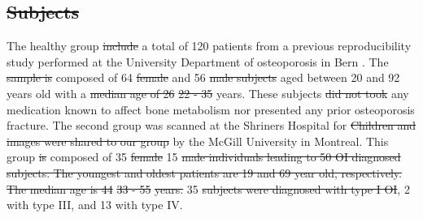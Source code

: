 \documentclass[a4paper,fleqn]{DC_ArtStyle}
\providecommand{\DIFadd}[1]{{\protect\color{blue}{#1}}} %
\providecommand{\DIFdel}[1]{{\protect\color{red}\sout{#1}}}                      %
\providecommand{\DIFaddbegin}{} %
\providecommand{\DIFaddend}{} %
\providecommand{\DIFdelbegin}{} %
\providecommand{\DIFdelend}{} %
\begin{document}
\subsection{\DIFdelbegin \DIFdel{Subjects}\DIFdelend \DIFaddbegin \DIFadd{Participants}\DIFaddend }
The healthy group \DIFdelbegin \DIFdel{include }\DIFdelend \DIFaddbegin \DIFadd{included }\DIFaddend a total of 120 patients from a previous reproducibility study performed at the University Department of osteoporosis in Bern \cite{Schenk2020}. The \DIFdelbegin \DIFdel{sample is }\DIFdelend \DIFaddbegin \DIFadd{group was }\DIFaddend composed of 64 \DIFdelbegin \DIFdel{female }\DIFdelend \DIFaddbegin \DIFadd{females }\DIFaddend and 56 \DIFdelbegin \DIFdel{male subjects }\DIFdelend \DIFaddbegin \DIFadd{males }\DIFaddend aged between 20 and 92 years old with a \DIFdelbegin \DIFdel{median age of 26 }%
\DIFdel{22 - 35}%
\DIFdelend \DIFaddbegin \DIFadd{mean age of 32 $\pm$ 15 }\DIFaddend years. These subjects \DIFdelbegin \DIFdel{did not took }\DIFdelend \DIFaddbegin \DIFadd{had not taken }\DIFaddend any medication known to affect bone metabolism nor presented \DIFaddbegin \DIFadd{with }\DIFaddend any prior osteoporosis fracture. The second group was scanned \DIFaddbegin \DIFadd{as part of the ASTEROID study at different locations in Canada, namely }\DIFaddend at the Shriners Hospital for \DIFdelbegin \DIFdel{Children and images were shared to our group }\DIFdelend \DIFaddbegin \DIFadd{Children-Canada. The study coordination was done }\DIFaddend by the McGill University in Montreal. This group \DIFdelbegin \DIFdel{is }\DIFdelend \DIFaddbegin \DIFadd{was }\DIFaddend composed of 35 \DIFdelbegin \DIFdel{female }\DIFdelend \DIFaddbegin \DIFadd{females and }\DIFaddend 15 \DIFdelbegin \DIFdel{male individuals leading to 50 OI diagnosed subjects. The youngest and oldest patients are 19 and 69 year old, respectively. The median age is 44 }%
\DIFdel{33 - 55}%
\DIFdel{years. }\DIFdelend \DIFaddbegin \DIFadd{males with confirmed diagnosis of OI Type I, III or IV. There were }\DIFaddend 35 \DIFdelbegin \DIFdel{subjects were diagnosed with type I OI}\DIFdelend \DIFaddbegin \DIFadd{patients diagnosed with OI type I}\DIFaddend , 2 with type III, and 13 with type IV. \DIFaddbegin \DIFadd{The participants of the OI group were aged between 19 and 69 years old with a mean age of 44 $\pm$ 14 years. 
}\DIFaddend 
\end{document}
